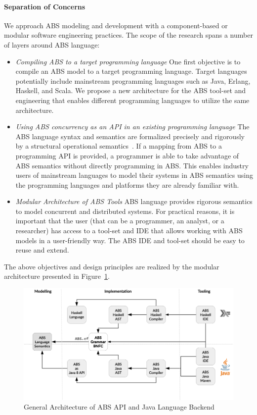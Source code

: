 \paragraph{Separation of Concerns} 
We approach ABS modeling and development with a component-based or modular 
software engineering practices.
The scope of the research spans a number of layers around ABS language:

\begin{itemize}
\item \emph{Compiling ABS to a target programming language}
One first objective is to compile an ABS model to a target programming language.
Target languages potentially include mainstream programming languages such as
Java, Erlang, Haskell, and Scala.
We propose a new architecture for the ABS tool-set and engineering that enables
different programming languages to utilize the same architecture.
\item \emph{Using ABS concurrency as an API in an existing programming language}
The ABS language syntax and semantics are formalized precisely and rigorously by a structural operational semantics~\cite{johnsen2012abs}.
If a mapping from ABS to a programming API is provided, a programmer is able to
take advantage of ABS semantics without directly programming in ABS.
This enables industry users of mainstream languages to
model their systems in ABS semantics using the programming languages and
platforms they are already familiar with.
\item \emph{Modular Architecture of ABS Tools}
ABS language provides rigorous semantics to model concurrent
and distributed systems.
For practical reasons, it is important that the user (that can be a programmer, an analyst, or a researcher) 
has access to a tool-set and IDE that allows working with ABS 
models in a user-friendly way.
The ABS IDE and tool-set should be easy to reuse and extend.
\end{itemize}

The above objectives and design principles are realized by the modular architecture presented in 
Figure~\ref{fig:arch}.

\begin{figure}[t]
\centering
\includegraphics[scale=0.3]{../figs/Arch.eps}
\caption[General Architecture]{General Architecture of ABS API and Java Language Backend}
\label{fig:arch}
\end{figure}

